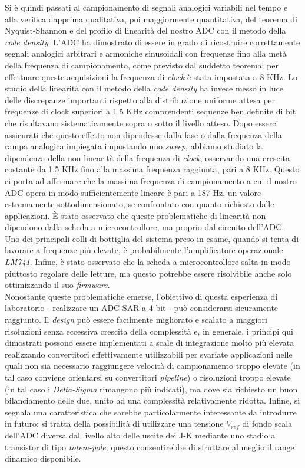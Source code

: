 \documentclass[journal]{IEEEtran}
\begin{document}
Si è quindi passati al campionamento di segnali analogici variabili nel tempo e alla verifica dapprima qualitativa, poi maggiormente quantitativa, del teorema di Nyquist-Shannon e del profilo di linearità del nostro ADC con il metodo della \textit{code density}. L'ADC ha dimostrato di essere in grado di ricostruire correttamente segnali analogici arbitrari e armoniche sinusoidali con frequenze fino alla metà della frequenza di campionamento, come previsto dal suddetto teorema; per effettuare queste acquisizioni la frequenza di \textit{clock} è stata impostata a 8 KHz. Lo studio della linearità con il metodo della \textit{code density} ha invece messo in luce delle discrepanze importanti rispetto alla distribuzione uniforme attesa per frequenze di clock superiori a 1.5 KHz comprendenti sequenze ben definite di bit che risultavano sistematicamente sopra o sotto il livello atteso. Dopo esserci assicurati che questo effetto non dipendesse dalla fase o dalla frequenza della rampa analogica impiegata impostando uno \textit{sweep}, abbiamo studiato la dipendenza della non linearità della frequenza di \textit{clock}, osservando una crescita costante da 1.5 KHz fino alla massima frequenza raggiunta, pari a 8 KHz. Questo ci porta ad affermare che la massima frequenza di campionamento a cui il nostro ADC opera in modo sufficientemente lineare è pari a 187 Hz, un valore estremamente sottodimensionato, se confrontato con quanto richiesto dalle applicazioni. È stato osservato che queste problematiche di linearità non dipendono dalla scheda a microcontrollore, ma proprio dal circuito dell'ADC. Uno dei principali colli di bottiglia del sistema preso in esame, quando si tenta di lavorare a frequenze più elevate, è probabilmente l'amplificatore operazionale \textit{LM741}. Infine, è stato osservato che la scheda a microcontrollore salta in modo piuttosto regolare delle letture, ma questo potrebbe essere risolvibile anche solo ottimizzando il suo \textit{firmware}.
\\

Nonostante queste problematiche emerse, l'obiettivo di questa esperienza di laboratorio - realizzare un ADC SAR a 4 bit - può considerarsi sicuramente raggiunto. Il \textit{design} può essere facilmente migliorato e scalato a maggiori risoluzioni senza eccessiva crescita della complessità e, in generale, i principi qui dimostrati possono essere implementati a scale di integrazione molto più elevata realizzando convertitori effettivamente utilizzabili per svariate applicazioni nelle quali non sia necessario raggiungere velocità di campionamento troppo elevate (in tal caso conviene orientarsi su convertitori \textit{pipeline}) o risoluzioni troppo elevate (in tal caso i \textit{Delta-Sigma} rimangono più indicati), ma dove sia richiesto un buon bilanciamento delle due, unito ad una complessità relativamente ridotta. Infine, si segnala una caratteristica che sarebbe particolarmente interessante da introdurre in futuro: si tratta della possibilità di utilizzare una tensione $V_{ref}$ di fondo scala dell'ADC diversa dal livello alto delle uscite dei J-K mediante uno stadio a transistor di tipo \textit{totem-pole}; questo consentirebbe di sfruttare al meglio il range dinamico disponibile.
\\
\end{document}
